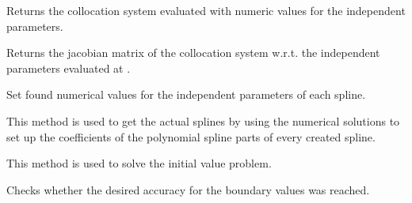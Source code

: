 \documentclass[letterpaper,10pt,english]{sphinxmanual}
\begin{document}
\begin{fulllineitems}
\begin{fulllineitems}
\end{fulllineitems}


\begin{fulllineitems}
\label{pytrajectory:pytrajectory.trajectory.Trajectory.G}
Returns the collocation system evaluated with numeric values for the
independent parameters.

\end{fulllineitems}


\begin{fulllineitems}
\label{pytrajectory:pytrajectory.trajectory.Trajectory.DG}
Returns the jacobian matrix of the collocation system w.r.t. the
independent parameters evaluated at .

\end{fulllineitems}


\begin{fulllineitems}
\label{pytrajectory:pytrajectory.trajectory.Trajectory.setCoeff}
Set found numerical values for the independent parameters of each spline.

This method is used to get the actual splines by using the numerical
solutions to set up the coefficients of the polynomial spline parts of
every created spline.

\end{fulllineitems}


\begin{fulllineitems}
\label{pytrajectory:pytrajectory.trajectory.Trajectory.simulateIVP}
This method is used to solve the initial value problem.

\end{fulllineitems}


\begin{fulllineitems}
\label{pytrajectory:pytrajectory.trajectory.Trajectory.checkAccuracy}
Checks whether the desired accuracy for the boundary values was reached.


\end{fulllineitems}
\end{fulllineitems}
\end{document}
